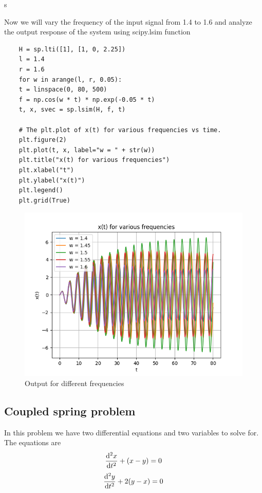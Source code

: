 s\documentclass{article}
\begin{document}
    Now we will vary the frequency of the input signal from 1.4 to 1.6 and analyze the output response of the system using scipy.lsim function
\begin{verbatim}
    H = sp.lti([1], [1, 0, 2.25])
    l = 1.4
    r = 1.6
    for w in arange(l, r, 0.05):
    t = linspace(0, 80, 500)
    f = np.cos(w * t) * np.exp(-0.05 * t)
    t, x, svec = sp.lsim(H, f, t)

    # The plt.plot of x(t) for various frequencies vs time.
    plt.figure(2)
    plt.plot(t, x, label="w = " + str(w))
    plt.title("x(t) for various frequencies")
    plt.xlabel("t")
    plt.ylabel("x(t)")
    plt.legend()
    plt.grid(True)

\end{verbatim}
\begin{figure}[!ht]
  \centering
  \includegraphics[scale=1]{Figure_2.png}
  \caption{Output for different frequencies}
  \label{fig:sample}
  \end{figure}
 
 \subsection{Coupled spring problem}
 In this problem we have two differential equations and two variables to solve for.
The equations are
\begin{equation}
\dv[2]{x}{t} +(x-y) = 0
\end{equation}
\begin{equation}
\dv[2]{y}{t} +2(y-x) = 0   
\end{equation}
\end{document}
